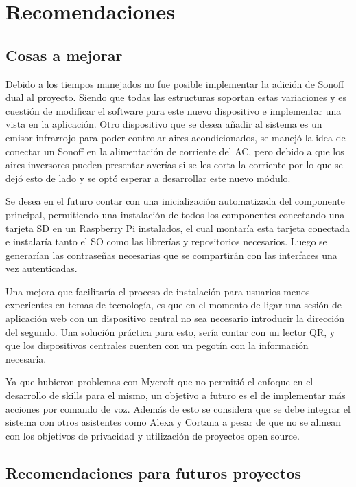 \chapter{Recomendaciones}

\section{Cosas a mejorar}

Debido a los tiempos manejados no fue posible implementar la adición de Sonoff dual al proyecto. Siendo que todas las estructuras soportan estas variaciones y es cuestión de modificar el software para este nuevo dispositivo e implementar una vista en la aplicación.
Otro dispositivo que se desea añadir al sistema es un emisor infrarrojo para poder controlar aires acondicionados, se manejó la idea de conectar un Sonoff en la alimentación de corriente del AC, pero debido a que los aires inversores pueden presentar averías si se les corta la corriente por lo que se dejó esto de lado y se optó esperar a desarrollar este nuevo módulo.

Se desea en el futuro contar con una inicialización automatizada del componente principal, permitiendo una instalación de todos los componentes conectando una tarjeta SD en un Raspberry Pi instalados, el cual montaría esta tarjeta conectada e instalaría tanto el SO como las librerías y repositorios necesarios. Luego se generarían las contraseñas necesarias que se compartirán con las interfaces una vez autenticadas.

Una mejora que facilitaría el proceso de instalación para usuarios menos experientes en temas de tecnología, es que en el momento de ligar una sesión de aplicación web con un dispositivo central no sea necesario introducir la dirección del segundo. Una solución práctica para esto, sería contar con un lector QR, y que los dispositivos centrales cuenten con un pegotín con la información necesaria.

Ya que hubieron problemas con Mycroft que no permitió el enfoque en el desarrollo de skills para el mismo, un objetivo a futuro es el de implementar más acciones por comando de voz. Además de esto se considera que se debe integrar el sistema con otros asistentes como Alexa y Cortana a pesar de que no se alinean con los objetivos de privacidad y utilización de proyectos open source.

\section{Recomendaciones para futuros proyectos}

